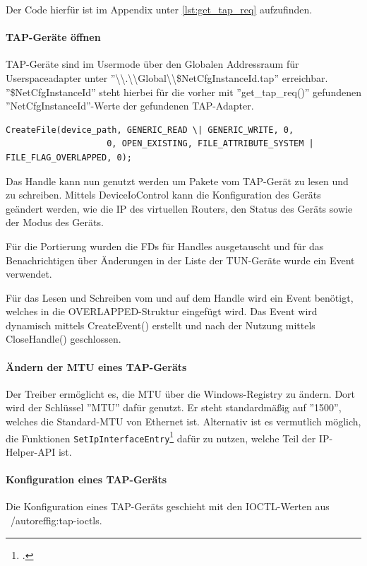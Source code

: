 {Der Code hierfür ist im Appendix unter \autoref{lst:get_tap_req} aufzufinden.

\paragraph{TAP-Geräte öffnen}
TAP-Geräte sind im Usermode über den Globalen Addressraum für Userspaceadapter
unter ''\textbackslash{}\textbackslash{}.\textbackslash{}\textbackslash{}Global\textbackslash{}\textbackslash{}\$NetCfgInstanceId.tap'' erreichbar.
''\$NetCfgInstanceId'' steht hierbei für die vorher mit ''get\_tap\_req()'' gefundenen
''NetCfgInstanceId''-Werte der gefundenen TAP-Adapter.

\begin{lstlisting}[numbers=none]
CreateFile(device_path, GENERIC_READ \| GENERIC_WRITE, 0,
                    0, OPEN_EXISTING, FILE_ATTRIBUTE_SYSTEM | FILE_FLAG_OVERLAPPED, 0);
\end{lstlisting}

Das Handle kann nun genutzt werden um Pakete vom TAP-Gerät zu lesen und zu schreiben.
Mittels DeviceIoControl kann die Konfiguration des Geräts geändert werden,
wie die IP des virtuellen Routers, den Status des Geräts sowie der Modus des Geräts.

Für die Portierung wurden die \acp{FD} für Handles ausgetauscht und für das Benachrichtigen
über Änderungen in der Liste der TUN-Geräte wurde ein Event verwendet.

Für das Lesen und Schreiben vom und auf dem Handle wird ein Event benötigt,
welches in die OVERLAPPED-Struktur eingefügt wird. Das Event wird dynamisch mittels CreateEvent()
erstellt und nach der Nutzung mittels CloseHandle() geschlossen.

\paragraph{Ändern der MTU eines TAP-Geräts}
Der Treiber ermöglicht es,
die \ac{MTU} über die Windows-Registry zu ändern. Dort wird der Schlüssel ''MTU''
dafür genutzt. Er steht standardmäßig auf ''1500'', welches die Standard-\ac{MTU}
von Ethernet ist. Alternativ ist es vermutlich möglich, die Funktionen 
\texttt{SetIpInterfaceEntry}\footcite[][]{_setipinterfaceentry_2016} dafür zu nutzen, welche Teil der IP-Helper-\ac{API} ist.

\paragraph{Konfiguration eines TAP-Geräts}
Die Konfiguration eines TAP-Geräts geschieht mit den IOCTL-Werten aus ~/autoref{fig:tap-ioctls}.

}

